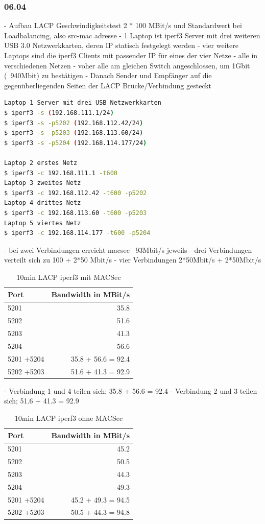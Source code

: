 \documentclass[english,runningheads,a4paper]{llncs}[2018/03/10]
\begin{document}
\subsubsection{06.04}
- Aufbau LACP Geschwindigkeitstest 2 * 100 MBit/s und Standardwert bei Loadbalancing, also src-mac adresse
- 1 Laptop ist iperf3 Server mit drei weiteren USB 3.0 Netzwerkkarten, deren IP statisch festgelegt werden
- vier weitere Laptops sind die iperf3 Clients mit passender IP für eines der vier Netze
- alle in verschiedenen Netzen 
- voher alle am gleichen Switch angeschlossen, um 1Gbit (~940Mbit) zu bestätigen
- Danach Sender und Empfänger auf die gegenüberliegenden Seiten der LACP Brücke/Verbindung gesteckt
\begin{lstlisting}[language=bash]
Laptop 1 Server mit drei USB Netzwerkkarten
$ iperf3 -s (192.168.111.1/24)
$ iperf3 -s -p5202 (192.168.112.42/24)
$ iperf3 -s -p5203 (192.168.113.60/24)
$ iperf3 -s -p5204 (192.168.114.177/24)

Laptop 2 erstes Netz
$ iperf3 -c 192.168.111.1 -t600
Laptop 3 zweites Netz
$ iperf3 -c 192.168.112.42 -t600 -p5202
Laptop 4 drittes Netz
$ iperf3 -c 192.168.113.60 -t600 -p5203
Laptop 5 viertes Netz
$ iperf3 -c 192.168.114.177 -t600 -p5204
\end{lstlisting}
- bei zwei Verbindungen erreicht macsec ~93Mbit/s jeweils
- drei Verbindungen verteilt sich zu 100 + 2*50 Mbit/s
- vier Verbindungen 2*50Mbit/s + 2*50Mbit/s
\begin{table}
	\caption{10min LACP iperf3 mit MACSec}
	\label{tab:LACPMACSec}
	\centering
	\begin{tabular}{lr}
		\toprule
		Port & Bandwidth in MBit/s\\
		\midrule
		5201      & 35.8      \\
		5202     & 51.6     \\
		5203      & 41.3      \\
		5204     & 56.6     \\
		\bottomrule
		5201 +5204     & 35.8 + 56.6 = 92.4      \\
		5202 +5203     & 51.6 + 41.3 = 92.9      \\
	\end{tabular}
\end{table}
- Verbindung 1 und 4 teilen sich; 35.8 + 56.6 = 92.4
- Verbindung 2 und 3 teilen sich; 51.6 + 41.3 = 92.9

\begin{table}
	\caption{10min LACP iperf3 ohne MACSec}
	\label{tab:LACPohneMACSec}
	\centering
	\begin{tabular}{lr}
		\toprule
		Port & Bandwidth in MBit/s\\
		\midrule
		5201      & 45.2      \\
		5202     & 50.5    \\
		5203      & 44.3      \\
		5204     & 49.3     \\
		\bottomrule
		5201 +5204     & 45.2 + 49.3 = 94.5      \\
		5202 +5203     & 50.5 + 44.3 = 94.8      \\
	\end{tabular}
\end{table}
\end{document}

